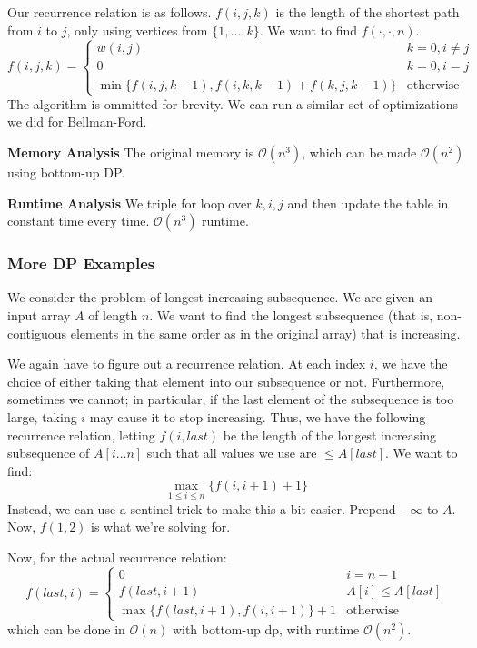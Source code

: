 \begin{algothm}
    Our recurrence relation is as follows. $f(i, j, k)$ is the length of the shortest path from $i$ to $j$, only using vertices from $\{1, \dots, k\}$. We want to find $f(\cdot, \cdot, n)$.
    \[ f(i, j, k) = \begin{cases}
        w(i, j) & k = 0, i \neq j \\
        0 & k = 0, i = j \\
        \min\{f(i, j, k - 1), f(i, k, k - 1) + f(k, j, k - 1)\} & \text{otherwise}
    \end{cases} \]
    The algorithm is ommitted for brevity. We can run a similar set of optimizations we did for Bellman-Ford.

    \textbf{Memory Analysis}
    The original memory is $\mathcal{O}(n^3)$, which can be made $\mathcal{O}(n^2)$ using bottom-up DP.

    \textbf{Runtime Analysis} We triple for loop over $k, i, j$ and then update the table in constant time every time. $\mathcal{O}(n^3)$ runtime.
\end{algothm}

\subsubsection{More DP Examples}
We consider the problem of longest increasing subsequence. We are given an input array $A$ of length $n$. We want to find the longest
subsequence (that is, non-contiguous elements in the same order as in the original array) that is increasing.

We again have to figure out a recurrence relation. At each index $i$, we have the choice of either taking that element into our
subsequence or not. Furthermore, sometimes we cannot; in particular, if the last element of the subsequence is too large, taking $i$
may cause it to stop increasing. Thus, we have the following recurrence relation, letting $f(i, last)$ be the length of the longest increasing
subsequence of $A[i \dots n]$ such that all values we use are $\leq A[last]$. We want to find:
\[ \max_{1 \leq i \leq n} \{ f(i, i + 1) + 1 \} \]
Instead, we can use a sentinel trick to make this a bit easier. Prepend $- \infty$ to $A$. Now,
$f(1, 2)$ is what we're solving for.

Now, for the actual recurrence relation:
\[ f(last, i) = \begin{cases}
    0 & i = n + 1 \\
    f(last, i + 1) & A[i] \leq A[last] \\
    \max\{f(last, i + 1), f(i, i + 1) \} + 1 & \text{otherwise}
\end{cases} \]
which can be done in $\mathcal{O}(n)$ with bottom-up dp, with runtime $\mathcal{O}(n^2)$.